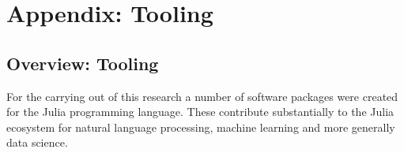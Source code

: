 \documentclass{book}
\begin{document}
	\appendix{}
	\part{Appendix: Tooling}
	\label{Tooling}
	\chapter{Overview: Tooling}
	For the carrying out of this research a number of software packages were created for the Julia programming language.
	These contribute substantially to the Julia ecosystem for natural language processing, machine learning and more generally data science.
	
	
%	
	
	
\end{document}
